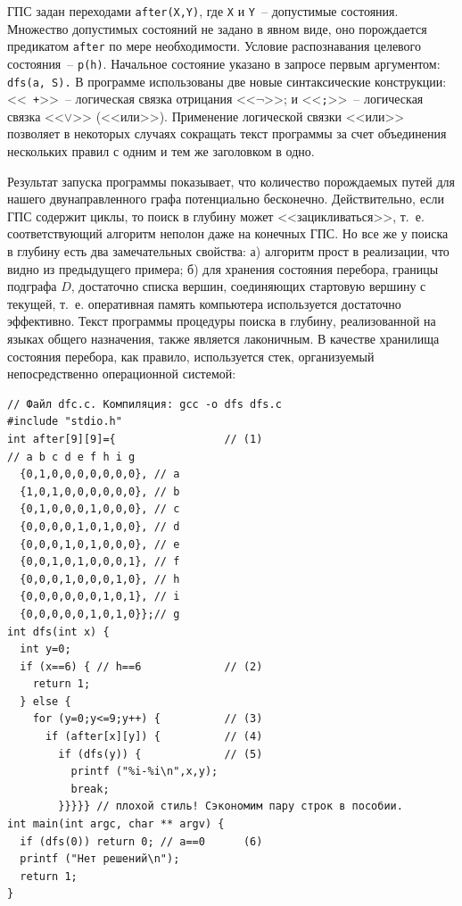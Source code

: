 \documentclass[a4paper,14pt, openany, twoside, final]{extbook} %
\begin{document}
ГПС задан переходами \texttt{after(X,Y)}, где \texttt{X} и \texttt{Y}~-- допустимые состояния.  Множество допустимых состояний не задано в явном виде, оно порождается предикатом \texttt{after} по мере необходимости.  Условие распознавания целевого состояния~-- \texttt{p(h)}.  Начальное состояние указано в запросе первым аргументом: \texttt{dfs(a, S).}  В программе использованы две новые синтаксические конструкции: <<\texttt{\text{\textbackslash} +}>>~--  логическая связка отрицания <<$\neg$>>; и <<\texttt{;}>>~-- логическая связка <<$\vee$>> (<<или>>).  Применение  логической связки <<или>> позволяет в некоторых случаях сокращать текст программы за счет объединения нескольких правил с одним и тем же заголовком в одно.

Результат запуска программы показывает, что количество порождаемых путей для нашего двунаправленного графа потенциально бесконечно.  Действительно, если ГПС содержит циклы, то поиск в глубину может <<зацикливаться>>, т.~е. соответствующий алгоритм неполон даже на конечных ГПС.  Но все же у поиска в глубину есть два замечательных свойства: а) алгоритм прост в реализации, что видно из предыдущего примера; б) для хранения состояния перебора, границы подграфа $D$, достаточно списка вершин, соединяющих стартовую вершину с текущей, т.~е. оперативная память компьютера используется достаточно эффективно.  Текст программы процедуры поиска в глубину, реализованной на языках общего назначения, также является лаконичным.  В качестве хранилища состояния перебора, как правило, используется стек, организуемый непосредственно операционной системой:

\begin{verbatim}
// Файл dfc.c. Компиляция: gcc -o dfs dfs.c
#include "stdio.h"
int after[9][9]={                 // (1)
// a b c d e f h i g
  {0,1,0,0,0,0,0,0,0}, // a
  {1,0,1,0,0,0,0,0,0}, // b
  {0,1,0,0,0,1,0,0,0}, // c
  {0,0,0,0,1,0,1,0,0}, // d
  {0,0,0,1,0,1,0,0,0}, // e
  {0,0,1,0,1,0,0,0,1}, // f
  {0,0,0,1,0,0,0,1,0}, // h
  {0,0,0,0,0,0,1,0,1}, // i
  {0,0,0,0,0,1,0,1,0}};// g
int dfs(int x) {
  int y=0;
  if (x==6) { // h==6             // (2)
    return 1;
  } else {
    for (y=0;y<=9;y++) {          // (3)
      if (after[x][y]) {          // (4)
        if (dfs(y)) {             // (5)
          printf ("%i-%i\n",x,y);
          break;
        }}}}} // плохой стиль! Сэкономим пару строк в пособии.
int main(int argc, char ** argv) {
  if (dfs(0)) return 0; // a==0      (6)
  printf ("Нет решений\n");
  return 1;
}
\end{verbatim}
\end{document}
